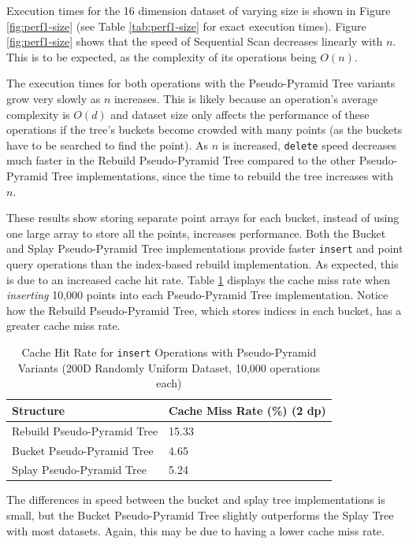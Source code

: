 Execution times for the 16 dimension dataset of varying size is shown in Figure \ref{fig:perf1-size} (see Table \ref{tab:perf1-size} for exact execution times). Figure \ref{fig:perf1-size} shows that the speed of Sequential Scan decreases linearly with $n$. This is to be expected, as the complexity of its operations being $O(n)$.

The execution times for both operations with the Pseudo-Pyramid Tree variants grow very slowly as $n$ increases. This is likely because an operation's average complexity is $O(d)$ and dataset size only affects the performance of these operations if the tree's buckets become crowded with many points (as the buckets have to be searched to find the point). As $n$ is increased, \texttt{delete} speed decreases much faster in the Rebuild Pseudo-Pyramid Tree compared to the other Pseudo-Pyramid Tree implementations, since the time to rebuild the tree increases with $n$.

These results show storing separate point arrays for each bucket, instead of using one large array to store all the points, increases performance. Both the Bucket and Splay Pseudo-Pyramid Tree implementations provide faster \texttt{insert} and point query operations than the index-based rebuild implementation. As expected, this is due to an increased cache hit rate. Table \ref{tab:perf1-cache-hit-rate} displays the cache miss rate when \textit{inserting} 10,000 points into each Pseudo-Pyramid Tree implementation. Notice how the Rebuild Pseudo-Pyramid Tree, which stores indices in each bucket, has a greater cache miss rate. 

\begin{table}
	\centering
	\begin{tabular}{|l|l|}
		\hline
		\textbf{Structure} & \textbf{Cache Miss Rate (\%) (2 dp)} \\
		\hline
		Rebuild Pseudo-Pyramid Tree & 15.33 \\
		Bucket Pseudo-Pyramid Tree & 4.65 \\
		Splay Pseudo-Pyramid Tree & 5.24 \\
		\hline
	\end{tabular}
	\caption{Cache Hit Rate for \texttt{insert} Operations with Pseudo-Pyramid Variants (200D Randomly Uniform Dataset, 10,000 operations each)}
	\label{tab:perf1-cache-hit-rate}
\end{table}

The differences in speed between the bucket and splay tree implementations is small, but the Bucket Pseudo-Pyramid Tree slightly outperforms the Splay Tree with most datasets. Again, this may be due to having a lower cache miss rate. 

